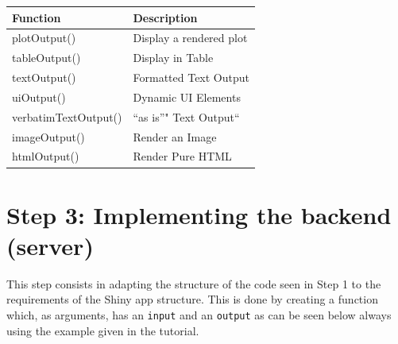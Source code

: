 \documentclass[12pt,]{krantz}
\newenvironment{Shaded}{\begin{snugshade}}{\end{snugshade}}
\newcommand{\KeywordTok}[1]{\textcolor[rgb]{0.27,0.27,0.27}{\textbf{#1}}}
\newcommand{\DataTypeTok}[1]{\textcolor[rgb]{0.27,0.27,0.27}{#1}}
\newcommand{\DecValTok}[1]{\textcolor[rgb]{0.06,0.06,0.06}{#1}}
\newcommand{\StringTok}[1]{\textcolor[rgb]{0.5,0.5,0.5}{#1}}
\newcommand{\CommentTok}[1]{\textcolor[rgb]{0.37,0.37,0.37}{\textit{#1}}}
\newcommand{\ControlFlowTok}[1]{\textcolor[rgb]{0.27,0.27,0.27}{\textbf{#1}}}
\newcommand{\OperatorTok}[1]{\textcolor[rgb]{0.43,0.43,0.43}{\textbf{#1}}}
\newcommand{\NormalTok}[1]{#1}
\begin{document}
\begin{longtable}[]{@{}ll@{}}
\toprule
Function & Description\tabularnewline
\midrule
\endhead
plotOutput() & Display a rendered plot\tabularnewline
tableOutput() & Display in Table\tabularnewline
textOutput() & Formatted Text Output\tabularnewline
uiOutput() & Dynamic UI Elements\tabularnewline
verbatimTextOutput() & ``as is''" Text Output``\tabularnewline
imageOutput() & Render an Image\tabularnewline
htmlOutput() & Render Pure HTML\tabularnewline
\bottomrule
\end{longtable}

\section{Step 3: Implementing the backend
(server)}\label{step-3-implementing-the-backend-server}

This step consists in adapting the structure of the code seen in Step 1
to the requirements of the Shiny app structure. This is done by creating
a function which, as arguments, has an \texttt{input} and an
\texttt{output} as can be seen below always using the example given in
the tutorial.

\begin{Shaded}
\end{Shaded}
\end{document}
